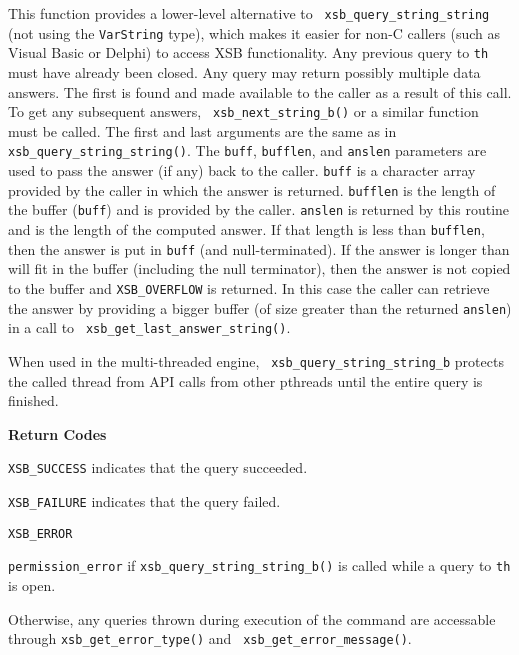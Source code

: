 \begin{description}
\item[{\mbox{\tt {\small int xsb\_query\_string\_string\_b(th\_context *th,char *query,char *buff,int bufflen,int *anslen,char *sep)}}}]
%
This function provides a lower-level alternative to {\tt
  xsb\_query\_string\_string} (not using the {\tt VarString} type),
which makes it easier for non-C callers (such as Visual Basic or
Delphi) to access XSB functionality.  Any previous query to {\tt th}
must have already been closed.  Any query may return possibly multiple
data answers.  The first is found and made available to the caller as
a result of this call.  To get any subsequent answers, {\tt
  xsb\_next\_string\_b()} or a similar function must be called.  The
first and last arguments are the same as in {\tt
  xsb\_query\_string\_string()}.  The \verb|buff|, \verb|bufflen|, and
\verb|anslen| parameters are used to pass the answer (if any) back to
the caller.  \verb|buff| is a character array provided by the caller
in which the answer is returned.  \verb|bufflen| is the length of the
buffer (\verb|buff|) and is provided by the caller.  \verb|anslen| is
returned by this routine and is the length of the computed answer.  If
that length is less than \verb|bufflen|, then the answer is put in
\verb|buff| (and null-terminated).  If the answer is longer than will
fit in the buffer (including the null terminator), then the answer is
not copied to the buffer and {\tt XSB\_OVERFLOW} is returned.  In this
case the caller can retrieve the answer by providing a bigger buffer
(of size greater than the returned \verb|anslen|) in a call to {\tt
  xsb\_get\_last\_answer\_string()}.

When used in the multi-threaded engine, {\tt
  xsb\_query\_string\_string\_b} protects the called thread from API
calls from other pthreads until the entire query is finished.

{\bf Return Codes}  
\bi
\item {\tt XSB\_SUCCESS} indicates that the query succeeded.
%
\item {\tt XSB\_FAILURE} indicates that the query failed.
%
\item {\tt XSB\_ERROR} 
\bi
\item {\tt permission\_error} if {\tt xsb\_query\_string\_string\_b()}
  is called while a query to {\tt th} is open.
%
\item Otherwise, any queries thrown during execution of the command
  are accessable through {\tt xsb\_get\_error\_type()} and {\tt
    xsb\_get\_error\_message()}.
\ei


\end{description}
